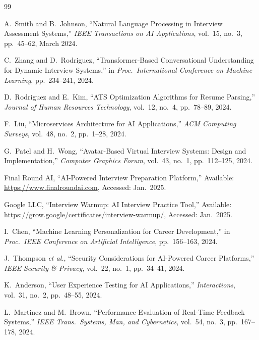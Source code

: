 \documentclass[12pt,a4paper,oneside]{report}
\begin{document}
\begin{thebibliography}{99}

A.~Smith and B.~Johnson, ``Natural Language Processing in Interview Assessment Systems,'' \textit{IEEE Transactions on AI Applications}, vol.~15, no.~3, pp.~45--62, March 2024.

C.~Zhang and D.~Rodriguez, ``Transformer-Based Conversational Understanding for Dynamic Interview Systems,'' in \textit{Proc.\ International Conference on Machine Learning}, pp.~234--241, 2024.

D.~Rodriguez and E.~Kim, ``ATS Optimization Algorithms for Resume Parsing,'' \textit{Journal of Human Resources Technology}, vol.~12, no.~4, pp.~78--89, 2024.

F.~Liu, ``Microservices Architecture for AI Applications,'' \textit{ACM Computing Surveys}, vol.~48, no.~2, pp.~1--28, 2024.

G.~Patel and H.~Wong, ``Avatar-Based Virtual Interview Systems: Design and Implementation,'' \textit{Computer Graphics Forum}, vol.~43, no.~1, pp.~112--125, 2024.

Final Round AI, ``AI-Powered Interview Preparation Platform,'' Available: \url{https://www.finalroundai.com}, Accessed: Jan.\ 2025.

Google LLC, ``Interview Warmup: AI Interview Practice Tool,'' Available: \url{https://grow.google/certificates/interview-warmup/}, Accessed: Jan.\ 2025.

I.~Chen, ``Machine Learning Personalization for Career Development,'' in \textit{Proc.\ IEEE Conference on Artificial Intelligence}, pp.~156--163, 2024.

J.~Thompson \textit{et al.}, ``Security Considerations for AI-Powered Career Platforms,'' \textit{IEEE Security \& Privacy}, vol.~22, no.~1, pp.~34--41, 2024.

K.~Anderson, ``User Experience Testing for AI Applications,'' \textit{Interactions}, vol.~31, no.~2, pp.~48--55, 2024.

L.~Martinez and M.~Brown, ``Performance Evaluation of Real-Time Feedback Systems,'' \textit{IEEE Trans.\ Systems, Man, and Cybernetics}, vol.~54, no.~3, pp.~167--178, 2024.


\end{thebibliography}
\end{document}
